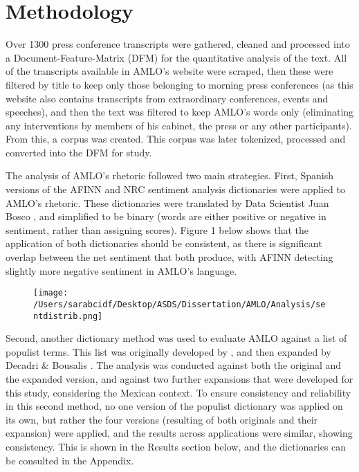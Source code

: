\documentclass[]{article}
\begin{document}
\section{Methodology}

Over 1300 press conference transcripts were gathered, cleaned and processed into a Document-Feature-Matrix (DFM) for the quantitative analysis of the text. All of the transcripts available in AMLO's website \cite{noauthor_transcripciones_nodate} were scraped, then these were filtered by title to keep only those belonging to morning press conferences (as this website also contains transcripts from extraordinary conferences, events and speeches), and then the text was filtered to keep AMLO's words only (eliminating any interventions by members of his cabinet, the press or any other participants). From this, a corpus was created. This corpus was later tokenized, processed and converted into the DFM for study. 

The analysis of AMLO's rhetoric followed two main strategies. First, Spanish versions of the AFINN and NRC sentiment analysis dictionaries were applied to AMLO's rhetoric. These dictionaries were translated by Data Scientist Juan Bosco \cite{vega_lexicos_2023}, and simplified to be binary (words are either positive or negative in sentiment, rather than assigning scores). Figure 1 below shows that the application of both dictionaries should be consistent, as there is significant overlap between the net sentiment that both produce, with AFINN detecting slightly more negative sentiment in AMLO's language.

\begin{figure}[H]
	\centering
	\caption{\label{}}
	\texttt{[image: /Users/sarabcidf/Desktop/ASDS/Dissertation/AMLO/Analysis/sentdistrib.png]}
\end{figure}

Second, another dictionary method was used to evaluate AMLO against a list of populist terms. This list was originally developed by \cite{rooduijn_measuring_2011}, and then expanded by Decadri \& Bousalis \cite{decadri_populism_2020}. The analysis was conducted against both the original and the expanded version, and against two further expansions that were developed for this study, considering the Mexican context. To ensure consistency and reliability in this second method, no one version of the populist dictionary was applied on its own, but rather the four versions (resulting of both originals and their expansion) were applied, and the results across applications were similar, showing consistency. This is shown in the Results section below, and the dictionaries can be consulted in the Appendix. 
\end{document}
